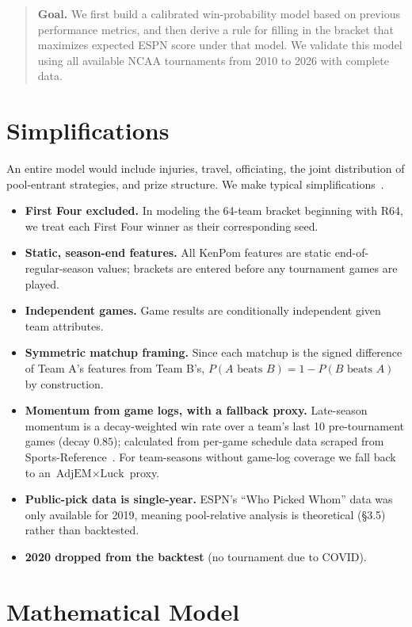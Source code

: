 \documentclass[12pt]{article}
\begin{document}
\begin{quote}
\textbf{Goal.} We first build a calibrated win-probability model based on previous performance metrics, and then derive a rule for filling in the bracket that maximizes expected ESPN score under that model. We validate this model using all available NCAA tournaments from 2010 to 2026 with complete data.
\end{quote}

\section{Simplifications}

An entire model would include injuries, travel, officiating, the joint distribution of pool-entrant strategies, and prize structure. We make typical simplifications~\cite{lightgbm,lopezmatthews}.

\begin{itemize}[leftmargin=*]
\item \textbf{First Four excluded.} In modeling the 64-team bracket beginning with R64, we treat each First Four winner as their corresponding seed.
\item \textbf{Static, season-end features.} All KenPom features are static end-of-regular-season values; brackets are entered before any tournament games are played.
\item \textbf{Independent games.} Game results are conditionally independent given team attributes.
\item \textbf{Symmetric matchup framing.} Since each matchup is the signed difference of Team A's features from Team B's, $P(A\text{ beats }B) = 1 - P(B\text{ beats }A)$ by construction.
\item \textbf{Momentum from game logs, with a fallback proxy.} Late-season momentum is a decay-weighted win rate over a team's last 10 pre-tournament games (decay $0.85$); calculated from per-game schedule data scraped from Sports-Reference~\cite{sportsref}. For team-seasons without game-log coverage we fall back to an $\text{AdjEM} \times \text{Luck}$ proxy.
\item \textbf{Public-pick data is single-year.} ESPN's ``Who Picked Whom'' data was only available for 2019, meaning pool-relative analysis is theoretical (\S3.5) rather than backtested.
\item \textbf{2020 dropped from the backtest} (no tournament due to COVID).
\end{itemize}

\section{Mathematical Model}
\end{document}
